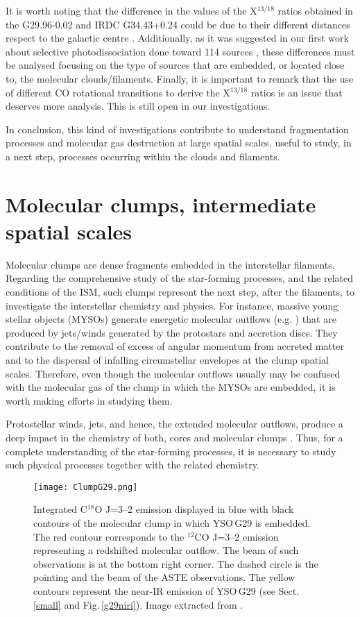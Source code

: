 \documentclass[baaa]{baaa}
\begin{document}
It is worth noting that the difference in the values of the X$^{13/18}$ ratios obtained in the G29.96-0.02 and IRDC G34.43+0.24 could be due to their different distances respect to the galactic centre \citep{wilson94}. Additionally, as it was suggested in our first work about selective photodissociation done toward 114 sources \citep{areal18}, these differences must be analysed focusing on the type of sources that are embedded, or located close to, the molecular clouds/filaments. Finally, it is important to remark that the use of different CO rotational transitions to derive the X$^{13/18}$ ratios is an issue that deserves more analysis. This is still open in our investigations. 

In conclusion, this kind of investigations contribute to understand fragmentation processes and molecular gas destruction at large spatial scales, useful to study, in a next step, processes occurring within the clouds and filaments. 


\section{Molecular clumps, intermediate spatial scales}

Molecular clumps are dense fragments embedded in the interstellar filaments. Regarding the comprehensive study of the star-forming processes, and the related conditions of the 
ISM, such clumps represent the next step, after the filaments, to investigate the interstellar chemistry and physics. 
For instance, massive young stellar objects (MYSOs) generate energetic molecular outflows (e.g. \citealt{arce07}) that 
are produced by jets/winds generated by the protostars and accretion discs. They contribute to the removal of excess of
angular momentum from accreted matter and to the dispersal of infalling circumstellar envelopes at the clump spatial scales. 
Therefore, even though the molecular outflows usually may be confused with the molecular gas of the clump in which
the MYSOs are embedded, it is worth making efforts in studying them. 

Protostellar winds, jets, and hence, the extended molecular outflows, produce a deep impact in the chemistry of both, cores and molecular clumps \citep{arce07,jorgen20,rojas24}. Thus, for a complete understanding of the star-forming processes, it is necessary to study such physical processes together with the related chemistry.  

\begin{figure}[h]
\centering
\texttt{[image: ClumpG29.png]}
\caption{Integrated C$^{18}$O J=3--2 emission displayed in blue with black contours of the
molecular clump in which YSO\,G29 is embedded. 
The red contour corresponds to the $^{12}$CO J=3--2 emission representing a redshifted molecular outflow. The beam of such observations is at the bottom right corner. 
The dashed circle is the pointing and the beam of the ASTE observations. The yellow contours represent the near-IR emission of YSO\,G29 (see Sect.\,\ref{small} and Fig.\,\ref{g29niri}). Image extracted from \citet{areal20}.}
\label{clumpg29}
\end{figure}
\end{document}
